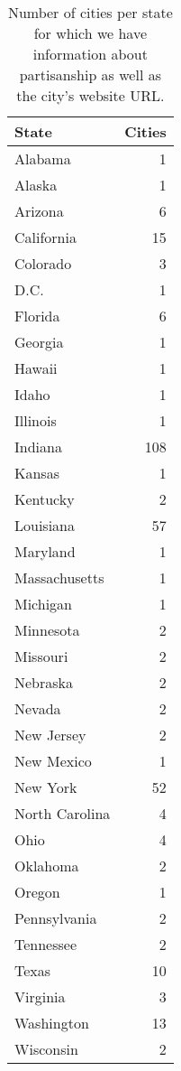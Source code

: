 \begin{table}[ht]
\centering
\begin{tabular}{lr}
  \hline
State & Cities \\ 
  \hline
Alabama &   1 \\ 
  Alaska &   1 \\ 
  Arizona &   6 \\ 
  California &  15 \\ 
  Colorado &   3 \\ 
  D.C. &   1 \\ 
  Florida &   6 \\ 
  Georgia &   1 \\ 
  Hawaii &   1 \\ 
  Idaho &   1 \\ 
  Illinois &   1 \\ 
  Indiana & 108 \\ 
  Kansas &   1 \\ 
  Kentucky &   2 \\ 
  Louisiana &  57 \\ 
  Maryland &   1 \\ 
  Massachusetts &   1 \\ 
  Michigan &   1 \\ 
  Minnesota &   2 \\ 
  Missouri &   2 \\ 
  Nebraska &   2 \\ 
  Nevada &   2 \\ 
  New Jersey &   2 \\ 
  New Mexico &   1 \\ 
  New York &  52 \\ 
  North Carolina &   4 \\ 
  Ohio &   4 \\ 
  Oklahoma &   2 \\ 
  Oregon &   1 \\ 
  Pennsylvania &   2 \\ 
  Tennessee &   2 \\ 
  Texas &  10 \\ 
  Virginia &   3 \\ 
  Washington &  13 \\ 
  Wisconsin &   2 \\ 
   \hline
\end{tabular}
\caption{Number of cities per state for which we have information about partisanship as well as the city's website URL.} 
\label{stateUrlSummary}
\end{table}

